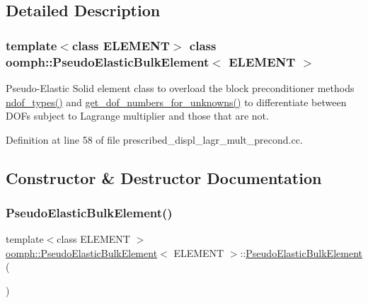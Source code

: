 \subsection{Detailed Description}
\subsubsection*{template$<$class E\+L\+E\+M\+E\+NT$>$\newline
class oomph\+::\+Pseudo\+Elastic\+Bulk\+Element$<$ E\+L\+E\+M\+E\+N\+T $>$}

Pseudo-\/\+Elastic Solid element class to overload the block preconditioner methods \hyperlink{classoomph_1_1PseudoElasticBulkElement_a18674d52b96db8800d31e89ffd465175}{ndof\+\_\+types()} and \hyperlink{classoomph_1_1PseudoElasticBulkElement_a8f1dc2011100324953293470a18f3080}{get\+\_\+dof\+\_\+numbers\+\_\+for\+\_\+unknowns()} to differentiate between D\+O\+Fs subject to Lagrange multiplier and those that are not. 

Definition at line 58 of file prescribed\+\_\+displ\+\_\+lagr\+\_\+mult\+\_\+precond.\+cc.



\subsection{Constructor \& Destructor Documentation}
\mbox{\label{classoomph_1_1PseudoElasticBulkElement_a38c03edd9639522e713ef9bf679d7e5a}} 
\subsubsection{\texorpdfstring{Pseudo\+Elastic\+Bulk\+Element()}{PseudoElasticBulkElement()}}
{\footnotesize\ttfamily template$<$class E\+L\+E\+M\+E\+NT $>$ \\
\hyperlink{classoomph_1_1PseudoElasticBulkElement}{oomph\+::\+Pseudo\+Elastic\+Bulk\+Element}$<$ E\+L\+E\+M\+E\+NT $>$\+::\hyperlink{classoomph_1_1PseudoElasticBulkElement}{Pseudo\+Elastic\+Bulk\+Element} (\begin{DoxyParamCaption}{ }\end{DoxyParamCaption})\hspace{0.3cm}{\ttfamily [inline]}}




